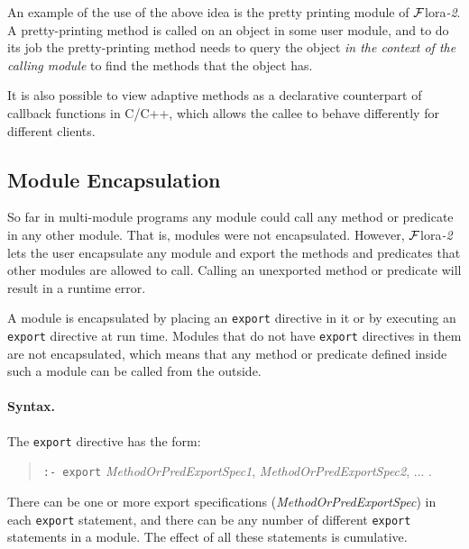 \documentclass[11pt]{article}
\newcommand{\FLORA}{{\mbox{\sc ${\cal F}${lora}\rm\emph{-2}}}\xspace}
\begin{document}
  An example of the use of the above idea is the pretty printing module of
  \FLORA.
  A pretty-printing method is called on an object in some
  user module, and to do its job the pretty-printing method needs to query
  the object \emph{in the context of the calling module} to find the
  methods that the object has.

It is also possible to view adaptive methods as a declarative counterpart
of callback functions in C/C++, which allows the callee to behave
differently for different clients.


\subsection{Module Encapsulation}\label{sec-module-encap}

So far in multi-module programs any module could call any method or
predicate in any other module. That is, modules were not encapsulated.
However, \FLORA lets the user encapsulate any module and export the
methods and predicates that other modules are allowed to call. Calling
an unexported method or predicate will result in a runtime error.

A module is encapsulated by placing an {\tt export} directive in it or by
executing an {\tt export} directive at run time.  Modules that do not have
{\tt export} directives in them are not encapsulated, which means that any
method or predicate defined inside such a module can be called from the outside.

\paragraph{Syntax.}
The {\tt export} directive has the form:
\begin{quote}
  {\tt :- export} \emph{MethodOrPredExportSpec1},
  \emph{MethodOrPredExportSpec2}, ... .
\end{quote}
There can be one or more export specifications
(\emph{MethodOrPredExportSpec}) in each {\tt export} statement, and there
can be any number of different {\tt export} statements in a module. The
effect of all 
these statements is cumulative.   
\end{document}

